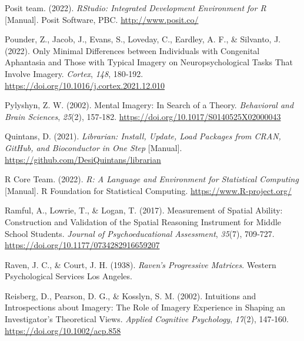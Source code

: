 \documentclass[
  12pt,
]{article}
\newlength{\cslhangindent}
\newlength{\cslentryspacingunit} %
\newenvironment{CSLReferences}[2] %
 {%
  \setlength{\parindent}{0pt}
  \ifodd #1
  \let\oldpar\par
  \def\par{\hangindent=\cslhangindent\oldpar}
  \fi
  \setlength{\parskip}{#2\cslentryspacingunit}
 }%
 {}
\begin{document}
\begin{CSLReferences}{1}{0}
\leavevmode{}%
Posit team. (2022). \emph{{RStudio}: {Integrated} Development
Environment for {R}} {[}Manual{]}. {Posit Software, PBC}.
\url{http://www.posit.co/}

\leavevmode{}%
Pounder, Z., Jacob, J., Evans, S., Loveday, C., Eardley, A. F., \&
Silvanto, J. (2022). Only Minimal Differences between Individuals with
Congenital Aphantasia and Those with Typical Imagery on
Neuropsychological Tasks That Involve Imagery. \emph{Cortex},
\emph{148}, 180‑192. \url{https://doi.org/10.1016/j.cortex.2021.12.010}

\leavevmode{}%
Pylyshyn, Z. W. (2002). Mental Imagery: {In} Search of a Theory.
\emph{Behavioral and Brain Sciences}, \emph{25}(2), 157‑182.
\url{https://doi.org/10.1017/S0140525X02000043}

\leavevmode{}%
Quintans, D. (2021). \emph{Librarian: {Install}, Update, Load Packages
from {CRAN}, {GitHub}, and Bioconductor in One Step} {[}Manual{]}.
\url{https://github.com/DesiQuintans/librarian}

\leavevmode{}%
R Core Team. (2022). \emph{R: {A} Language and Environment for
Statistical Computing} {[}Manual{]}. {R Foundation for Statistical
Computing}. \url{https://www.R-project.org/}

\leavevmode{}%
Ramful, A., Lowrie, T., \& Logan, T. (2017). Measurement of {Spatial
Ability}: {Construction} and {Validation} of the {Spatial Reasoning
Instrument} for {Middle School Students}. \emph{Journal of
Psychoeducational Assessment}, \emph{35}(7), 709‑727.
\url{https://doi.org/10.1177/0734282916659207}

\leavevmode{}%
Raven, J. C., \& Court, J. H. (1938). \emph{Raven's Progressive
Matrices}. {Western Psychological Services Los Angeles}.

\leavevmode{}%
Reisberg, D., Pearson, D. G., \& Kosslyn, S. M. (2002). Intuitions and
Introspections about Imagery: The Role of Imagery Experience in Shaping
an Investigator's Theoretical Views. \emph{Applied Cognitive
Psychology}, \emph{17}(2), 147‑160.
\url{https://doi.org/10.1002/acp.858}


\end{CSLReferences}
\end{document}
